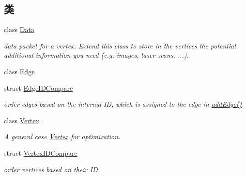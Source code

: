 \subsection*{类}
\begin{DoxyCompactItemize}
\item 
class \hyperlink{classg2o_1_1OptimizableGraph_1_1Data}{Data}
\begin{DoxyCompactList}\small\item\em data packet for a vertex. Extend this class to store in the vertices the potential additional information you need (e.\-g. images, laser scans, ...). \end{DoxyCompactList}\item 
class \hyperlink{classg2o_1_1OptimizableGraph_1_1Edge}{Edge}
\item 
struct \hyperlink{structg2o_1_1OptimizableGraph_1_1EdgeIDCompare}{Edge\-I\-D\-Compare}
\begin{DoxyCompactList}\small\item\em order edges based on the internal I\-D, which is assigned to the edge in \hyperlink{structg2o_1_1OptimizableGraph_a6831ed69fce3dba691f53302a2813070}{add\-Edge()} \end{DoxyCompactList}\item 
class \hyperlink{classg2o_1_1OptimizableGraph_1_1Vertex}{Vertex}
\begin{DoxyCompactList}\small\item\em A general case \hyperlink{classg2o_1_1OptimizableGraph_1_1Vertex}{Vertex} for optimization. \end{DoxyCompactList}\item 
struct \hyperlink{structg2o_1_1OptimizableGraph_1_1VertexIDCompare}{Vertex\-I\-D\-Compare}
\begin{DoxyCompactList}\small\item\em order vertices based on their I\-D \end{DoxyCompactList}\end{DoxyCompactItemize}

